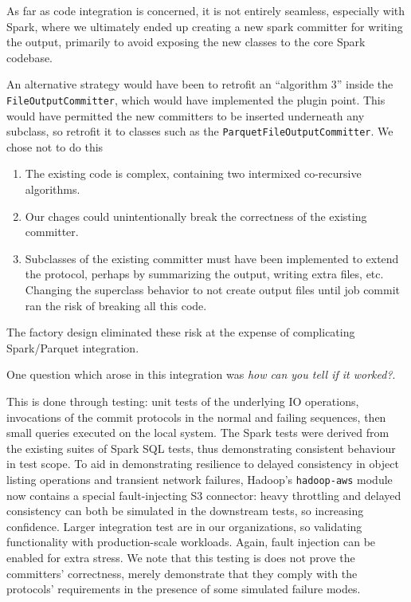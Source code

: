 \documentclass[conference]{IEEEtran}
\begin{document}
As far as code integration is concerned, it is not entirely seamless, especially
with Spark, where we ultimately ended up creating a new spark committer for
writing the output, primarily to avoid exposing the new classes to the core
Spark codebase.

An alternative strategy would have been to retrofit an ``algorithm 3'' inside
the \texttt{FileOutputCommitter}, which would have implemented the plugin point.
This would have permitted the new committers to be inserted underneath any
subclass, so retrofit it to classes such as the \texttt{ParquetFileOutputCommitter}.
We chose not to do this

\begin{enumerate}
  \item The existing code is complex, containing two intermixed co-recursive
  algorithms.
  \item Our chages could unintentionally break the correctness of the existing committer.
  \item Subclasses of the existing committer must have been implemented to extend
  the protocol, perhaps by summarizing the output, writing extra files, etc.
  Changing the superclass behavior to not create output files until job commit
  ran the risk of breaking all this code.
\end{enumerate}

The factory design eliminated these risk at the expense of complicating
Spark/Parquet integration.


One question which arose in this integration was \emph{how can you tell if it worked?}.

This is done through testing: unit tests of the underlying IO operations,
invocations of the commit protocols in the normal and failing sequences,
then small queries executed on the local system.
The Spark tests were derived from the existing suites of Spark SQL tests,
thus demonstrating consistent behaviour in test scope.
To aid in demonstrating resilience to delayed consistency in object listing
operations and transient network failures, Hadoop's \texttt{hadoop-aws} module
now contains a special fault-injecting S3 connector: heavy throttling and
delayed consistency can both be simulated in the downstream tests, so
increasing confidence.
Larger integration test are in our organizations, so validating functionality
with production-scale workloads.
Again, fault injection can be enabled for extra stress.
We note that this testing is does not prove the committers' correctness,
merely demonstrate that they comply with the protocols' requirements in
the presence of some simulated failure modes.
\end{document}
